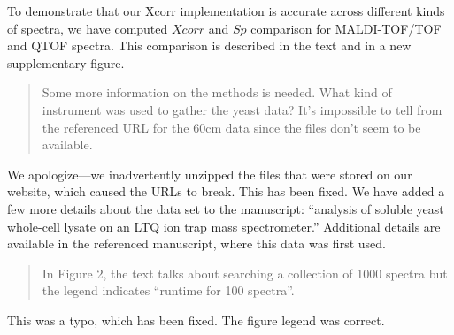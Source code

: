 \documentclass{article}
\newcommand{\breview}{\begin{quotation}\begin{em}\noindent}
\newcommand{\ereview}{\end{em}\end{quotation}}
\begin{document}
To demonstrate that our Xcorr implementation is accurate across
different kinds of spectra, we have computed $Xcorr$ and $Sp$ comparison
for MALDI-TOF/TOF and QTOF spectra.  This comparison is described in the
text and in a new supplementary figure. 

\breview Some more information on the methods is needed. What kind of
instrument was used to gather the yeast data? It's impossible to tell
from the referenced URL for the 60cm data since the files don't seem
to be available. \ereview

We apologize---we inadvertently unzipped the files that were stored on
our website, which caused the URLs to break.  This has been fixed.  We
have added a few more details about the data set to the manuscript:
``analysis of soluble yeast whole-cell lysate on an LTQ ion trap mass
spectrometer.''  Additional details are available in the referenced
manuscript, where this data was first used.

\breview In Figure 2, the text talks about searching a collection of
1000 spectra but the legend indicates ``runtime for 100
spectra''. \ereview

This was a typo, which has been fixed.  The figure legend was correct.
\end{document}

